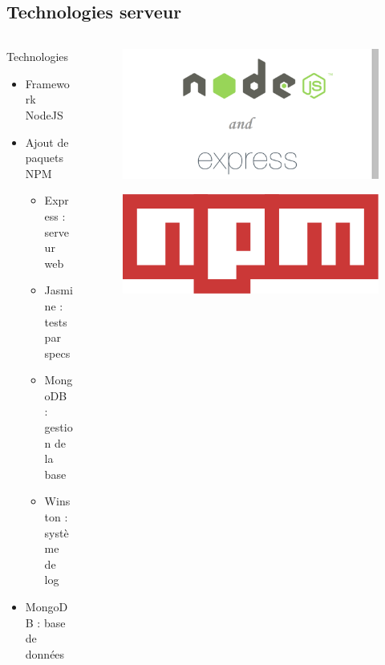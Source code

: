 \documentclass{beamer} %
\begin{document}
  \subsection{Technologies serveur}
  \begin{frame}{\subsecname}

    \begin{columns}
      \begin{column}{0.58\textwidth}
        \begin{block}{Technologies}
          \begin{itemize}
            \item Framework NodeJS
            \item Ajout de paquets NPM
            \begin{itemize}
              \item Express : serveur web
              \item Jasmine : tests par specs
              \item MongoDB : gestion de la base
              \item Winston : système de log
            \end{itemize}
            \item MongoDB : base de données
          \end{itemize}
        \end{block}
        
      \end{column}
      \begin{column}{0.38\textwidth}
        \begin{figure}
        \includegraphics[width=\linewidth, height=\textheight, keepaspectratio]{nodeexpress.png}
        \end{figure}
        \begin{figure}
          \includegraphics[width=\linewidth, height=0.1\textheight, keepaspectratio]{npm.png}
        \end{figure}
      \end{column}
    \end{columns}


\end{frame}
\end{document}
